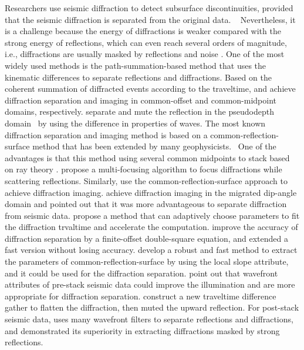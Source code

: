 \documentclass[10pt]{IEEEtran}
\begin{document}
Researchers use seismic diffraction to detect subsurface discontinuities, provided that the seismic diffraction is separated from the original data.  
Nevertheless, it is a challenge because the energy of diffractions is weaker compared with the strong energy of reflections, which can even reach several orders of magnitude, i.e., diffractions are usually masked by reflections and noise \cite{1994Theory, 2007Post,omar2020geo1}. 
One of the most widely used methods is the path-summation-based method that uses the kinematic differences to separate reflections and diffractions. Based on the coherent summation of diffracted events according to the traveltime, \cite{1987A} and \cite{1988Imaging} achieve diffraction separation and imaging in common-offset and common-midpoint domains, respectively. 
\cite{2004Diffraction} separate and mute the reflection in the pseudodepth domain  by using the difference in properties of waves.
The most known diffraction separation and imaging method is based on a common-reflection-surface method that has been extended by many geophysicists.
 One of the advantages is that this method using several common midpoints to stack based on ray theory \cite{2013Recovering}.
\cite{2009Diffraction} propose a multi-focusing algorithm to focus diffractions while scattering reflections.
Similarly, \cite{2011Common} use the common-reflection-surface approach to achieve diffraction imaging.
\cite{2012Separation} achieve diffraction imaging in the migrated dip-angle domain and pointed out that it was more advantageous to separate diffraction from seismic data. \cite{2013Diffraction} propose a method that can adaptively choose parameters to fit the diffraction trvaltime and accelerate the computation.
\cite{Coimbra2018Enhancement} improve the accuracy of diffraction separation by a finite-offset double-square equation, and extended a fast version without losing accuracy.
\cite{2018Fast} develop a robust and fast method to extract the parameters of common-reflection-surface by using the local slope attribute, and it could be used for the diffraction separation. 
\cite{2018Common} point out that wavefront attributes of pre-stack seismic data could improve the illumination and are more appropriate for diffraction separation.
\cite{20193D} construct a new traveltime difference gather to flatten the diffraction, then muted the upward reflection.
For post-stack seismic data, \cite{2019Coherent} uses many wavefront filters to separate reflections and diffractions, and demonstrated its superiority in extracting diffractions masked by strong reflections.
\end{document}
